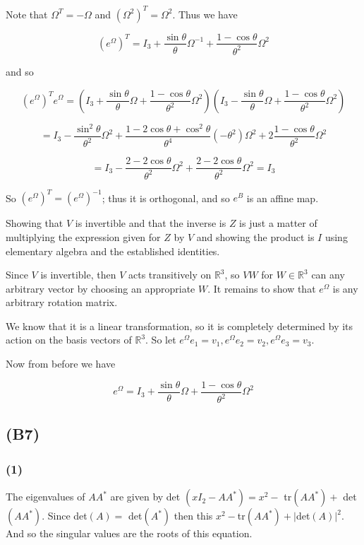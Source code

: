 \documentclass{article}
\begin{document}
Note that $\Omega^T = -\Omega$ and $(\Omega^2)^T = \Omega^2$. Thus we have 

\[ (e^{\Omega})^T = I_3 + \dfrac{\sin \theta}{\theta} \Omega^{-1} + \dfrac{1 - \cos \theta}{\theta^2} \Omega^2 \]

and so 

\[ (e^{\Omega})^T e^{\Omega} = \left(I_3 + \dfrac{\sin \theta}{\theta} \Omega + \dfrac{1 - \cos \theta}{\theta^2} \Omega^2 \right) \left(I_3 - \dfrac{\sin \theta}{\theta} \Omega + \dfrac{1 - \cos \theta}{\theta^2} \Omega^2 \right) \]

\[ = I_3 - \dfrac{\sin^2 \theta}{\theta^2} \Omega^2 + \dfrac{1 - 2\cos \theta + \cos^2 \theta}{\theta^4} (-\theta^2) \Omega^2  + 2\dfrac{1 - \cos \theta}{\theta^2} \Omega^2\]

\[ = I_3 - \dfrac{2 - 2 \cos \theta}{\theta^2} \Omega^2 + \dfrac{2 - 2 \cos \theta}{\theta^2} \Omega^2 = I_3\]

So $(e^{\Omega})^T = (e^{\Omega})^{-1}$; thus it is orthogonal, and so $e^B$ is an affine map. 

Showing that $V$ is invertible and that the inverse is $Z$ is just a matter of multiplying the expression given for $Z$ by $V$ and showing the product is $I$ using elementary algebra and the established identities. 

Since $V$ is invertible, then $V$ acts transitively on $\mathbb{R}^3$, so $VW$ for $W \in \mathbb{R}^3$ can any arbitrary vector by choosing an appropriate $W$. It remains to show that $e^{\Omega}$ is any arbitrary rotation matrix. 

We know that it is a linear transformation, so it is completely determined by its action on the basis vectors of $\mathbb{R}^3$. So let $e^{\Omega} e_1 = v_1, e^{\Omega} e_2 = v_2, e^{\Omega} e_3 = v_3$. 

Now from before we have 

\[ e^{\Omega} = I_3+ \dfrac{\sin \theta}{\theta} \Omega + \dfrac{1 - \cos \theta}{\theta^2} \Omega^2 \]

\subsection{(B7)}

\subsubsection{(1)}
The eigenvalues of $AA^*$ are given by det $(xI_2 - AA^*) = x^2 - $ tr$(AA^*) + $ det$(AA^*)$. Since det$(A) = $ det$(A^*)$ then this $x^2 - $tr$(AA^*) + |$det$(A)|^2$. And so the singular values are the roots of this equation. 
\end{document}
